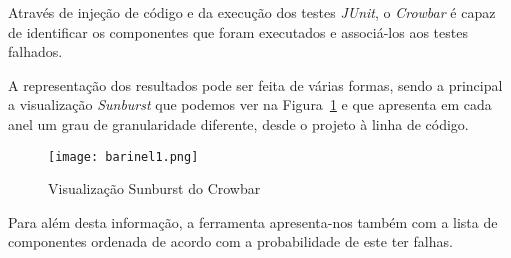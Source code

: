Através de injeção de código e da execução dos testes \emph{JUnit}, o \emph{Crowbar} é capaz de identificar os componentes que foram executados e associá-los aos testes falhados.

A representação dos resultados pode ser feita de várias formas, sendo a principal a visualização \emph{Sunburst} que podemos ver na Figura~\ref{fig:crowbar-sunburst} e que apresenta em cada anel um grau de granularidade diferente, desde o projeto à linha de código.

\begin{figure}[H]
  \begin{center}
    \leavevmode
    \texttt{[image: barinel1.png]}
    \caption{Visualização Sunburst do Crowbar}
    \label{fig:crowbar-sunburst}
  \end{center}
\end{figure}

Para além desta informação, a ferramenta apresenta-nos também com a lista de componentes ordenada de acordo com a probabilidade de este ter falhas.